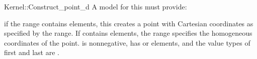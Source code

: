 \begin{ccRefFunctionObjectConcept}{Kernel::Construct_point_d}
A model for this must provide:


	{if the range \ccc{[first,last)} contains  elements,
	 this creates a point with Cartesian coordinates as specified by 
	 the range. If \ccc{[first,last)} contains  elements,
	 the range specifies the homogeneous coordinates of the point. 
	 \ccPrecond {} is nonnegative, \ccc{[first,last)} has 
	  or  elements, and the value types of first
	 and last are .}

\end{ccRefFunctionObjectConcept}
